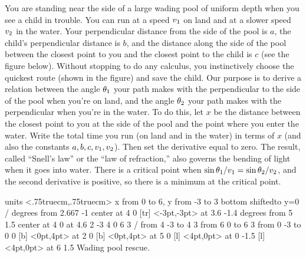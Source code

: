 \exercise
You are standing near the side of a large wading pool of uniform depth when
you see a child in trouble.  You can run at a speed $\displaystyle v_1$ on land and at a
slower speed $\displaystyle v_2$ in the water.  Your perpendicular distance from the side
of the pool is $a$, the child's perpendicular distance is $b$, and the
distance along the side of the pool between the closest point to you and
the closest point to the child is $c$ (see the figure below). 
Without stopping to do any calculus, you instinctively choose the
quickest route (shown in the figure) and save the child.  Our
purpose is to derive a relation between the angle $\displaystyle \theta_1$ your path
makes with the perpendicular to the side of the pool when you're on land,
and the angle $\displaystyle \theta_2$ your path makes with the perpendicular when you're
in the water.  To do this, let $x$ be the distance between the closest
point to you at the side of the pool and the point where you enter the
water.  Write the total time you run (on land and in the water) in 
terms of $x$ (and also the constants $\displaystyle a,b,c,v_1,v_2$).  Then set the
derivative equal to zero.  The result, called ``Snell's law'' or the ``law
of refraction,'' also governs the bending of light when it goes into water.
\answer There is a critical point when
$\displaystyle \sin\theta_1/v_1=\sin\theta_2/v_2$, and the second derivative is
positive, so there is a minimum at the critical point.
\endanswer

\figure
\texonly
\vbox{\beginpicture
\normalgraphs
\ninepoint
\setcoordinatesystem units <.75truecm,.75truecm>
\setplotarea x from 0 to 6, y from -3 to 3
\axis bottom shiftedto y=0 /
 degrees from 2.667 -1 center at 4 0
 [tr] <-3pt,-3pt> at 3.6 -1.4
 degrees from 5 1.5 center at 4 0
 at 4.6 2
\setlinear
{} -3 4 0 6 3 /
\setdashes
\putrule from 4 -3 to 4 3
\putrule from 6 0 to 6 3
\putrule from 0 -3 to 0 0
 [b] <0pt,4pt> at 2 0
 [b] <0pt,4pt> at 5 0
 [l] <4pt,0pt> at 0 -1.5
 [l] <4pt,0pt> at 6 1.5
\endpicture}
\endtexonly
{}
\begincaption
Wading pool rescue.
\endcaption
\endfigure
\endexercise

\endexercises

